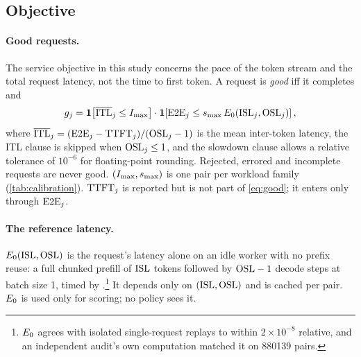 \subsection{Objective}
\label{sec:objective}

\paragraph{Good requests.}
The service objective in this study concerns the pace of the token stream and the total request
latency, not the time to first token. A request is \emph{good} iff it completes and
\begin{equation}
  \label{eq:good}
  g_j = \mathbf{1}\!\left[\overline{\mathrm{ITL}}_j \le I_{\max}\right]\cdot
            \mathbf{1}\!\left[\mathrm{E2E}_j \le s_{\max}\,E_0(\mathrm{ISL}_j,\mathrm{OSL}_j)\right],
\end{equation}
where $\overline{\mathrm{ITL}}_j = (\mathrm{E2E}_j - \mathrm{TTFT}_j)/(\mathrm{OSL}_j - 1)$ is the mean inter-token latency, the ITL
clause is skipped when $\mathrm{OSL}_j \le 1$, and the slowdown clause allows a relative tolerance of
$10^{-6}$ for floating-point rounding. Rejected, errored and incomplete requests are never good.
$(I_{\max}, s_{\max})$ is one pair per workload family (\cref{tab:calibration}). $\mathrm{TTFT}_j$ is reported but
is not part of \cref{eq:good}; it enters only through $\mathrm{E2E}_j$.

\paragraph{The reference latency.}
$E_0(\mathrm{ISL},\mathrm{OSL})$ is the request's latency alone on an idle worker with no prefix reuse: a full
chunked prefill of $\mathrm{ISL}$ tokens followed by $\mathrm{OSL} - 1$ decode steps at batch size 1, timed by
\ais{}.\footnote{$E_0$ agrees with isolated single-request replays to within $2\times10^{-8}$
  relative, and an independent audit's own computation matched it on \num{880139} pairs.}
It depends only on $(\mathrm{ISL}, \mathrm{OSL})$ and is cached per pair. $E_0$ is used only for scoring; no
policy sees it.

